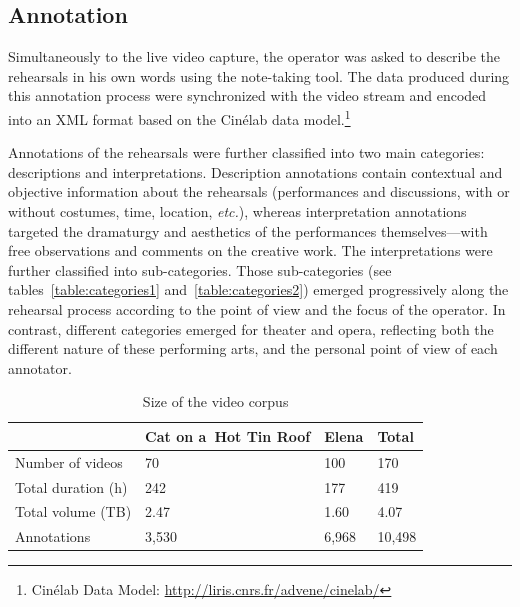 \documentclass[conference]{IEEEtran}
\newcommand{\todo}[1]{\noindent\textcolor{red}{{\bf \{ToDo} #1{\bf \}}}}
\begin{document}

\subsection{Annotation}
Simultaneously to the live video capture, the operator was asked to describe the rehearsals in his own words using  the note-taking tool. The data produced during this annotation process were synchronized with the video stream and encoded into an XML format based on the Cinélab data model.\footnote{Cinélab Data Model: \url{http://liris.cnrs.fr/advene/cinelab/}}

Annotations of the  rehearsals were further classified  into two main categories: descriptions and interpretations.  Description annotations contain contextual and objective information about the rehearsals  (performances and  discussions, with or without costumes, time, location, \emph{etc.}), whereas interpretation annotations targeted the dramaturgy and aesthetics of the performances themselves---with free observations and comments on the creative work. The interpretations were further classified into sub-categories. Those sub-categories (see tables~\ref{table:categories1} and~\ref{table:categories2}) emerged progressively along the rehearsal process according to the point of view and the focus of the operator. 
In contrast, different categories emerged for theater and opera, reflecting both the different nature of these performing arts, and the personal point of view of each annotator.

\begin{table}
\small
\begin{tabular}{|p{2.8cm}|p{1.8cm}|p{1.2cm}|p{1.2cm}|}
\hline 
  & Cat on a~Hot Tin Roof  & Elena & Total \\ 
\hline 
Number of videos & 70 & 100 & 170 \\ 
\hline 
Total duration (h) & 242 & 177 & 419 \\ 
\hline 
Total volume (TB) & 2.47 & 1.60 & 4.07 \\ 
\hline 
Annotations & 3,530 & 6,968 & 10,498\\ 
\hline
\end{tabular} 
\caption{Size of the video corpus}
\label{table_facts}
\end{table}
\end{document}
